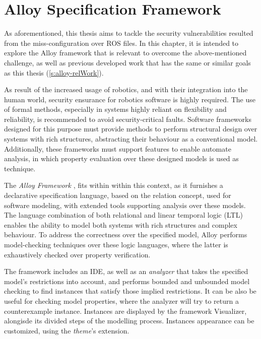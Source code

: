 \chapter{Alloy Specification Framework}\label{c:alloy}

As aforementioned, this thesis aims to tackle the security vulnerabilities resulted from the miss-configuration over ROS files. In this chapter, it is intended to explore the Alloy framework that is relevant to overcome the above-mentioned challenge, as well as previous developed work that has the same or similar goals as this thesis (\ref{s:alloy-relWork}).

As result of the increased usage of robotics, and with their integration into the human world, security ensurance for robotics software is highly required. The use of formal methods, especially in systems highly reliant on flexibility and reliability, is recommended to avoid security-critical faults. \cite{carvalho2020analysis} Software frameworks designed for this purpose must provide methods to perform structural design over systems with rich structures, abstracting their behaviour as a conventional model. Additionally, these frameworks must support features to enable automate analysis, in which property evaluation over these designed models is used as technique. 

The \textit{Alloy Framework} \cite{alloy-DJ}, fits within within this context, as it furnishes a declarative specification language, based on the relation concept, used for software modeling, with extended tools supporting analysis over these models. \cite{alloy-6} The language combination of both relational and linear temporal logic (LTL) enables the ability to model both systems with rich structures and complex behaviour. To address the correctness over the specified model, Alloy performs model-checking techniques over these logic languages, where the latter is exhaustively checked over property verification. \cite{lwspecification, carvalho2020analysis}

The framework includes an IDE, as well as an \textit{analyzer} that takes the specified model's restrictions into account, and performs bounded and unbounded model checking to find instances that satisfy those implied restrictions. It can be also be useful for checking model properties, where the analyzer will try to return a counterexample instance. Instances are displayed by the framework Visualizer, alongisde its divided steps of the modelling process. Instances appearance can be customized, using the \textit{theme}'s extension. \cite{alloy-6}

